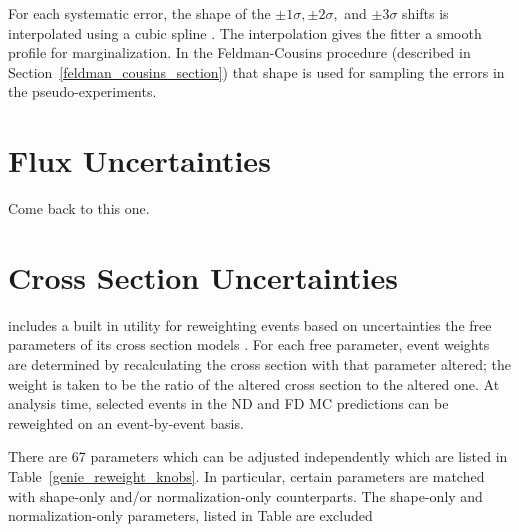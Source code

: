 For each systematic error, the shape of the
$\pm 1\sigma, \pm2\sigma,$ and
$\pm3\sigma$ shifts is interpolated using a cubic spline
\cite{atkinson1978introduction}.
The interpolation gives the fitter a smooth profile for marginalization.
In the Feldman-Cousins procedure \cite{feldman1998unified} (described
in Section~\ref{feldman_cousins_section}) that shape
is used for sampling the errors in the pseudo-experiments.

\section{Flux Uncertainties}
\label{flux_syst_section}

Come back to this one.


\section{Cross Section Uncertainties}

\genie includes a built in utility for reweighting events based on
uncertainties the free parameters of its cross section models
\cite{genie}.
For each free parameter, event weights are determined by recalculating the
cross section with that parameter altered;
the weight is taken to be the ratio of the altered cross section
to the altered one.
At analysis time, selected events in the ND and FD MC predictions can be
reweighted on an event-by-event basis.

There are 67 parameters which can be adjusted independently which are listed
in Table~\ref{genie_reweight_knobs}.
In particular, certain parameters are matched with shape-only
and/or normalization-only counterparts.
The shape-only and normalization-only parameters, listed in Table
 are excluded 


